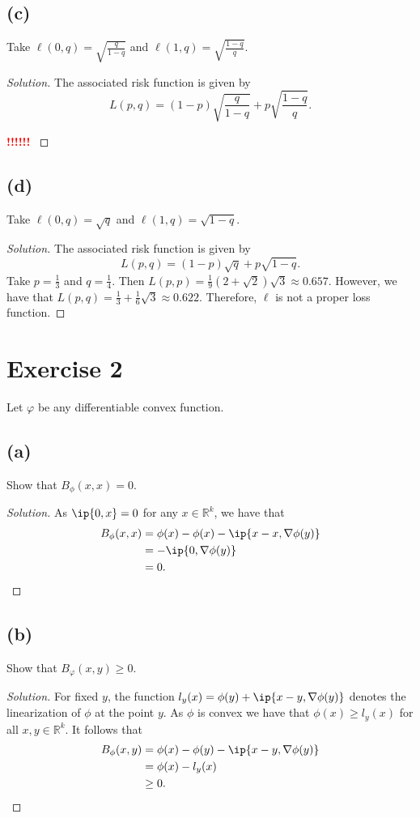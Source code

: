 \documentclass[10pt, a4paper, twoside]{amsart}
\newcommand{\R}{\ensuremath{\mathbb{R}}}
\DeclarePairedDelimiter{\ip}\langle\rangle
\newenvironment{solution}
               {\let\oldqedsymbol=\qedsymbol
                \renewcommand{\qedsymbol}{$\blacktriangleleft$}
                \begin{proof}[Solution]}
               {\end{proof}
                \renewcommand{\qedsymbol}{\oldqedsymbol}}
\newcommand{\TODO}{\textcolor{red}{\textbf{!!!!!! }}}
\begin{document}
\subsection*{(c)}
Take $\ell(0,q)=\sqrt{\frac{q}{1-q}}$ and $\ell(1,q)=\sqrt{\frac{1-q}{q}}$.
\begin{solution}
The associated risk function is given by
\begin{equation*}
L(p,q)=(1-p)\sqrt{\frac{q}{1-q}}+p\sqrt{\frac{1-q}{q}}.
\end{equation*}

\TODO
\end{solution}

\subsection*{(d)}
Take $\ell(0,q)=\sqrt{q}$ and $\ell(1,q)=\sqrt{1-q}$.
\begin{solution}
The associated risk function is given by
\begin{equation*}
L(p,q)=(1-p)\sqrt{q}+p\sqrt{1-q}.
\end{equation*}
Take $p=\tfrac{1}{3}$ and $q=\tfrac{1}{4}$. Then $L(p,p)= \tfrac{1}{9}(2+\sqrt{2})\sqrt{3}\approx 0.657$.
However, we have that $L(p,q)=\tfrac{1}{3}+\tfrac{1}{6}\sqrt{3} \approx 0.622$.
Therefore, $\ell$ is not a proper loss function.
\end{solution}

\section*{Exercise 2}
Let $\varphi$ be any differentiable convex function.
\subsection*{(a)}
Show that $B_{\phi}(x,x)=0$.
\begin{solution}
As $\ip{0,x}=0$ for any $x \in  \R^k$, we have that
\begin{align*}
  B_{\phi}(x,x)&=\phi(x)-\phi(x)-\ip{x-x,\nabla \phi(y)} \\
  &=-\ip{0,\nabla \phi(y)} \\
  &=0.
\end{align*}
\end{solution}

\subsection*{(b)}
Show that $B_{\varphi}(x,y)\geq 0$.
\begin{solution}
For fixed $y$, the function $l_y(x)=\phi(y)+\ip{x-y, \nabla \phi(y)}$ denotes the linearization of $\phi$ at the point $y$.
As $\phi$ is convex we have that $\phi(x)\geq l_y(x)$ for all $x,y \in \R^k$. 
It follows that 
\begin{align*}
 B_{\phi}(x,y)&=\phi(x)-\phi(y)-\ip{x-y, \nabla \phi(y)} \\
 &=\phi(x)-l_y(x) \\
 &\geq0.
\end{align*}
\end{solution}
\end{document}
